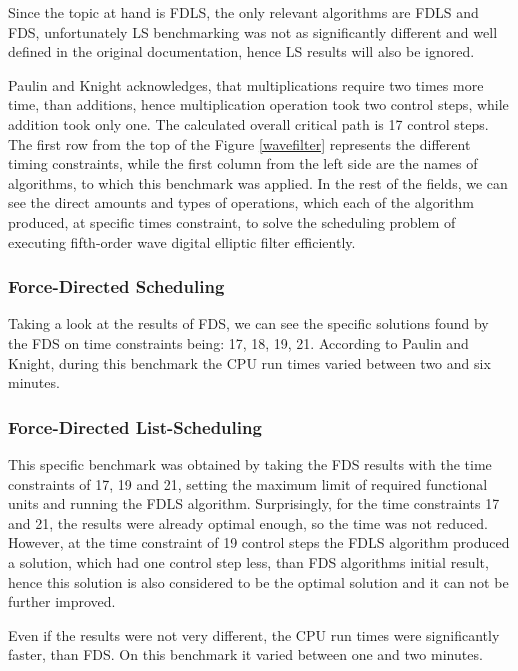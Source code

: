 \documentclass[conference]{IEEEtran}
\begin{document}
Since the topic at hand is FDLS, the only relevant algorithms are FDLS and FDS, unfortunately LS benchmarking was not as significantly different and well defined in the original documentation, hence LS results will also be ignored.

Paulin and Knight acknowledges, that multiplications require two times more time, than additions, hence multiplication operation took two control steps, while addition took only one. The calculated overall critical path is 17 control steps. The first row from the top of the Figure \ref{wavefilter} represents the different timing constraints, while the first column from the left side are the names of algorithms, to which this benchmark was applied. In the rest of the fields, we can see the direct amounts and types of operations, which each of the algorithm produced, at  specific times constraint, to solve the scheduling problem of executing fifth-order wave digital elliptic filter efficiently.

\subsubsection{Force-Directed Scheduling}

Taking a look at the results of FDS, we can see the specific solutions found by the FDS on time constraints being: 17, 18, 19, 21. According to Paulin and Knight, during this benchmark the CPU run times varied between two and six minutes.

\subsubsection{Force-Directed List-Scheduling}

This specific benchmark was obtained by taking the FDS results with the time constraints of 17, 19 and 21, setting the maximum limit of required functional units and running the FDLS algorithm. Surprisingly, for the time constraints 17 and 21, the results were already optimal enough, so the time was not reduced. However, at the time constraint of 19 control steps the FDLS algorithm produced a solution, which had one control step less, than FDS algorithms initial result, hence this solution is also considered to be the optimal solution and it can not be further improved. 

Even if the results were not very different, the CPU run times were significantly faster, than FDS. On this benchmark it varied between one and two minutes.
\end{document}

